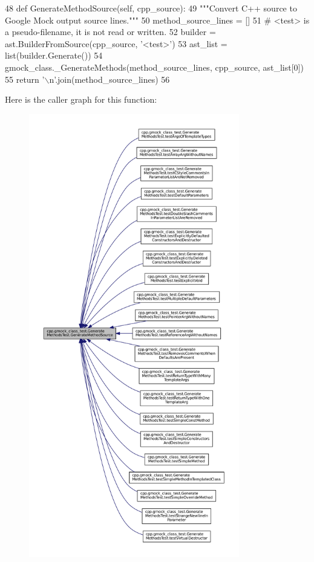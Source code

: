 \begin{DoxyCode}
48   \textcolor{keyword}{def }GenerateMethodSource(self, cpp\_source):
49     \textcolor{stringliteral}{"""Convert C++ source to Google Mock output source lines."""}
50     method\_source\_lines = []
51     \textcolor{comment}{# <test> is a pseudo-filename, it is not read or written.}
52     builder = ast.BuilderFromSource(cpp\_source, \textcolor{stringliteral}{'<test>'})
53     ast\_list = list(builder.Generate())
54     gmock\_class.\_GenerateMethods(method\_source\_lines, cpp\_source, ast\_list[0])
55     \textcolor{keywordflow}{return} \textcolor{stringliteral}{'\(\backslash\)n'}.join(method\_source\_lines)
56 
\end{DoxyCode}
Here is the caller graph for this function\+:
\nopagebreak
\begin{figure}[H]
\begin{center}
\leavevmode
\includegraphics[height=550pt]{classcpp_1_1gmock__class__test_1_1GenerateMethodsTest_af96a6c9fd394f7e27cf24f86814549c9_icgraph}
\end{center}
\end{figure}
